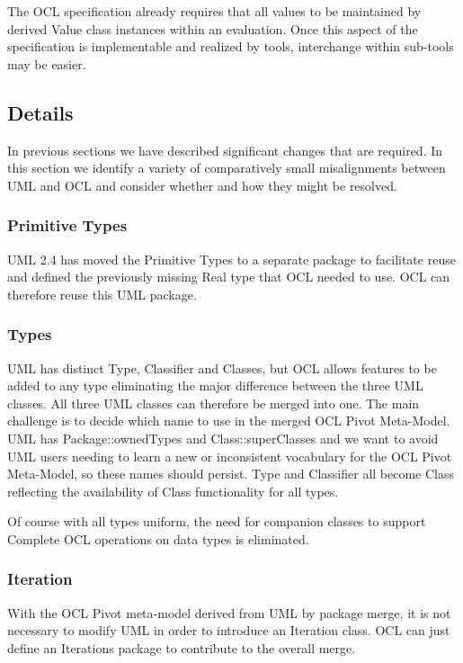 \documentclass{eceasst}
\begin{document}
The OCL specification already requires that all values to be maintained by derived Value class instances within an evaluation. Once this aspect of the specification is implementable and realized by tools, interchange within sub-tools may be easier. 

\subsection{Details}

In previous sections we have described significant changes that are required. In this section we identify a variety of comparatively small misalignments between UML and OCL and consider whether and how they might be resolved.

\subsubsection{Primitive Types}

UML 2.4 has moved the Primitive Types to a separate package to facilitate reuse and defined the previously missing Real type that OCL needed to use. OCL can therefore reuse this UML package.

\subsubsection{Types}

UML has distinct Type, Classifier and Classes, but OCL allows features to be added to any type eliminating the major difference between the three UML classes. All three UML classes can therefore be merged into one. The main challenge is to decide which name to use in the merged OCL Pivot Meta-Model. UML has Package::ownedTypes and Class::superClasses and we want to avoid UML users needing to learn a new or inconsistent vocabulary for the OCL Pivot Meta-Model, so these names should persist. Type and Classifier all become Class reflecting the availability of Class functionality for all types.

Of course with all types uniform, the need for companion classes to support Complete OCL operations on data types is eliminated.

\subsubsection{Iteration}

With the OCL Pivot meta-model derived from UML by package merge, it is not necessary to modify UML in order to introduce an Iteration class. OCL can just define an Iterations package to contribute to the overall merge.
\end{document}
